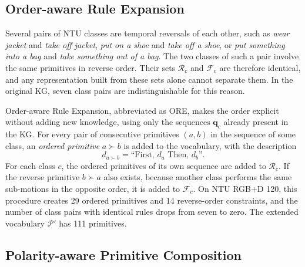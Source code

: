 \documentclass[11pt]{article}
\begin{document}
\subsection{Order-aware Rule Expansion}
\label{sec:seqkg}

Several pairs of NTU classes are temporal reversals of each other, such as \emph{wear jacket} and \emph{take off jacket}, \emph{put on a shoe} and \emph{take off a shoe}, or \emph{put something into a bag} and \emph{take something out of a bag}. The two classes of such a pair involve the same primitives in reverse order. Their sets $\mathcal{R}_c$ and $\mathcal{F}_c$ are therefore identical, and any representation built from these sets alone cannot separate them. In the original KG, seven class pairs are indistinguishable for this reason.

Order-aware Rule Expansion, abbreviated as ORE, makes the order explicit without adding new knowledge, using only the sequences $\mathbf{q}_c$ already present in the KG. For every pair of consecutive primitives $(a, b)$ in the sequence of some class, an \emph{ordered primitive} $a \!\succ\! b$ is added to the vocabulary, with the description
\begin{equation}
  d_{a \succ b} = \text{``First, } d_a \text{ Then, } d_b \text{''}.
  \label{eq:seqdesc}
\end{equation}
For each class $c$, the ordered primitives of its own sequence are added to $\mathcal{R}_c$. If the reverse primitive $b \!\succ\! a$ also exists, because another class performs the same sub-motions in the opposite order, it is added to $\mathcal{F}_c$. On NTU RGB+D 120, this procedure creates 29 ordered primitives and 14 reverse-order constraints, and the number of class pairs with identical rules drops from seven to zero. The extended vocabulary $\mathcal{P}'$ has 111 primitives.

\subsection{Polarity-aware Primitive Composition}
\label{sec:compose}
\end{document}
